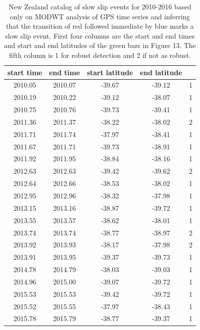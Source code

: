 \documentclass{article}
\begin{document}
 \begin{table}[hbt!]
 \caption{New Zealand catalog of slow slip events for 2010-2016 based only on MODWT analysis of GPS time series and inferring that the transition of red followed immediate by blue marks a slow slip event. First four columns are the start and end times and start and end latitudes of the green bars in Figure 13. The fifth column is 1 for robust detection and 2 if not as robust.}
 \centering
 \begin{tabular}{c c c c c}
 \hline
start time & end time & start latitude & end latitude & \\
 \hline
2010.05 & 2010.07 & -39.67 & -39.12 & 1 \\
2010.19 & 2010.22 & -39.12 & -38.07 & 1 \\
2010.75 & 2010.76 & -39.73 & -39.41 & 1 \\
2011.36 & 2011.37 & -38.22 & -38.02 & 2 \\
2011.71 & 2011.74 & -37.97 & -38.41 & 1 \\
2011.67 & 2011.71 & -39.73 & -38.91 & 1 \\
2011.92 & 2011.95 & -38.84 & -38.16 & 1 \\
2012.63 & 2012.63 & -39.42 & -39.62 & 2 \\
2012.64 & 2012.66 & -38.53 & -38.02 & 1 \\
2012.95 & 2012.96 & -38.32 & -37.98 & 1 \\
2013.15 & 2013.16 & -38.87 & -39.72 & 1 \\
2013.55 & 2013.57 & -38.62 & -38.01 & 1 \\
2013.74 & 2013.74 & -38.77 & -38.97 & 2 \\
2013.92 & 2013.93 & -38.17 & -37.98 & 2 \\
2013.91 & 2013.95 & -39.37 & -39.73 & 1 \\
2014.78 & 2014.79 & -38.03 & -39.03 & 1 \\
2014.96 & 2015.00 & -39.07 & -39.72 & 1 \\
2015.53 & 2015.53 & -39.42 & -39.72 & 1 \\ 
2015.52 & 2015.55 & -37.97 & -38.43 & 1 \\
2015.78 & 2015.79 & -38.77 & -39.37 & 1 \\
\hline
 \end{tabular}
 \end{table}
\end{document}
